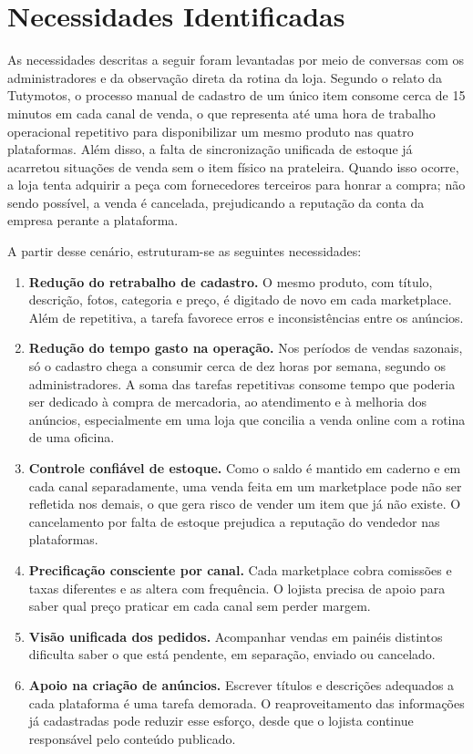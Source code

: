 \section{Necessidades Identificadas}
\label{sec:necessidades}

As necessidades descritas a seguir foram levantadas por meio de conversas com os administradores e da observação direta da rotina da loja. Segundo o relato da Tutymotos, o processo manual de cadastro de um único item consome cerca de 15 minutos em cada canal de venda, o que representa até uma hora de trabalho operacional repetitivo para disponibilizar um mesmo produto nas quatro plataformas. Além disso, a falta de sincronização unificada de estoque já acarretou situações de venda sem o item físico na prateleira. Quando isso ocorre, a loja tenta adquirir a peça com fornecedores terceiros para honrar a compra; não sendo possível, a venda é cancelada, prejudicando a reputação da conta da empresa perante a plataforma.

A partir desse cenário, estruturam-se as seguintes necessidades:

\begin{enumerate}
\item \textbf{Redução do retrabalho de cadastro.} O mesmo produto, com título, descrição, fotos, categoria e preço, é digitado de novo em cada marketplace. Além de repetitiva, a tarefa favorece erros e inconsistências entre os anúncios.
\item \textbf{Redução do tempo gasto na operação.} Nos períodos de vendas sazonais, só o cadastro chega a consumir cerca de dez horas por semana, segundo os administradores. A soma das tarefas repetitivas consome tempo que poderia ser dedicado à compra de mercadoria, ao atendimento e à melhoria dos anúncios, especialmente em uma loja que concilia a venda online com a rotina de uma oficina.
\item \textbf{Controle confiável de estoque.} Como o saldo é mantido em caderno e em cada canal separadamente, uma venda feita em um marketplace pode não ser refletida nos demais, o que gera risco de vender um item que já não existe. O cancelamento por falta de estoque prejudica a reputação do vendedor nas plataformas.
\item \textbf{Precificação consciente por canal.} Cada marketplace cobra comissões e taxas diferentes e as altera com frequência. O lojista precisa de apoio para saber qual preço praticar em cada canal sem perder margem.
\item \textbf{Visão unificada dos pedidos.} Acompanhar vendas em painéis distintos dificulta saber o que está pendente, em separação, enviado ou cancelado.
\item \textbf{Apoio na criação de anúncios.} Escrever títulos e descrições adequados a cada plataforma é uma tarefa demorada. O reaproveitamento das informações já cadastradas pode reduzir esse esforço, desde que o lojista continue responsável pelo conteúdo publicado.
\end{enumerate}


